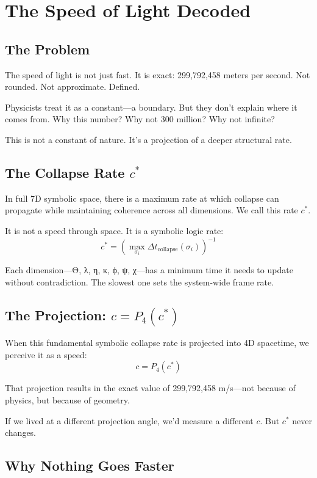 
\chapter{The Speed of Light Decoded}

\section{The Problem}

The speed of light is not just fast. It is exact: 299,792,458 meters per second. Not rounded. Not approximate. Defined.

Physicists treat it as a constant—a boundary. But they don’t explain where it comes from. Why this number? Why not 300 million? Why not infinite?

This is not a constant of nature. It’s a projection of a deeper structural rate.

\section{The Collapse Rate $c^*$}

In full 7D symbolic space, there is a maximum rate at which collapse can propagate while maintaining coherence across all dimensions. We call this rate $c^*$.

It is not a speed through space. It is a symbolic logic rate:
\[
c^* = \left( \max_{\sigma_i} \Delta t_{\text{collapse}}(\sigma_i) \right)^{-1}
\]

Each dimension—Θ, λ, η, κ, ϕ, ψ, χ—has a minimum time it needs to update without contradiction. The slowest one sets the system-wide frame rate.

\section{The Projection: $c = P_4(c^*)$}

When this fundamental symbolic collapse rate is projected into 4D spacetime, we perceive it as a speed:
\[
c = P_4(c^*)
\]

That projection results in the exact value of 299,792,458 m/s—not because of physics, but because of geometry.

If we lived at a different projection angle, we’d measure a different $c$. But $c^*$ never changes.

\section{Why Nothing Goes Faster}

